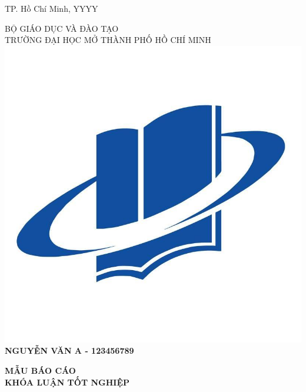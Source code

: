 \begin{titlepage}
\begin{center}

\vfill
TP. Hồ Chí Minh, YYYY

\end{center}

\pagebreak


\thispagestyle{empty}
\begin{center}

BỘ GIÁO DỤC VÀ ĐÀO TẠO\\
{TRƯỜNG ĐẠI HỌC MỞ THÀNH PHỐ HỒ CHÍ MINH}\\[1.cm]

\includegraphics[scale=0.15]{images/logo}\\[1.cm]

{\large \bfseries NGUYỄN VĂN A - 123456789\\[2cm]}

{ \huge \bfseries MẪU BÁO CÁO\\KHÓA LUẬN TỐT NGHIỆP
\\[2cm] } 



\end{center}
\end{titlepage}
